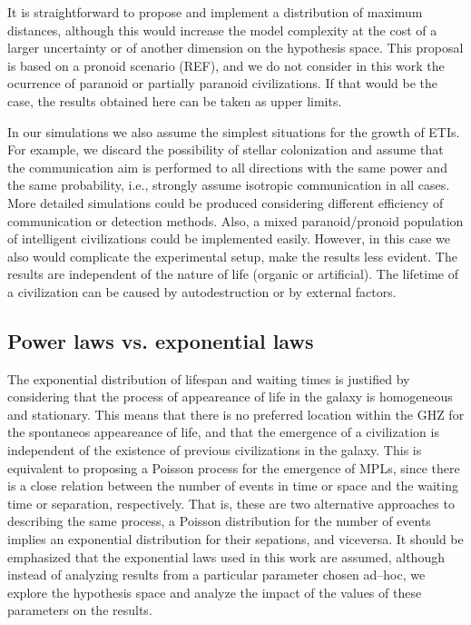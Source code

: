 %
It is straightforward to propose and implement a distribution of
maximum distances, although this would increase the model complexity
at the cost of a larger uncertainty or of another dimension on the
hypothesis space.
%
This proposal is based on a pronoid scenario (REF), and we do not
consider in this work the ocurrence of paranoid or partially paranoid
civilizations.
%
If that would be the case, the results obtained here can be taken as
upper limits.



In our simulations we also assume the simplest situations for the
growth of ETIs.
%
For example, we discard the possibility of stellar colonization
\citep[e.g.][]{newman_galactic_1981, walters_interstellar_1980,
starling_virulence_2013, barlow_galactic_2012, jeong_large_2000, maccone_mathematical_2011}
and assume that the communication aim is performed to
all directions with the same power and the same probability, i.e.,
strongly assume isotropic communication in all cases.
%
More detailed simulations could be produced considering different 
efficiency of communication or detection methods.
%
Also, a mixed paranoid/pronoid population of intelligent civilizations
could be implemented easily.
%
However, in this case we also would complicate the experimental setup,
make the results less evident.
%
The results are independent of the nature of life (organic or
artificial).
%
The lifetime of a civilization can be caused by autodestruction or by
external factors.

\subsection{Power laws vs. exponential laws}\label{SS_PDF_shape}

The exponential distribution of lifespan and waiting times is
justified by considering that the process of appeareance of life in
the galaxy is homogeneous and stationary.
%
This means that there is no preferred location within the GHZ for the
spontaneos appeareance of life, and that the emergence of a
civilization is independent of the existence of previous civilizations 
in the galaxy.
%            
This is equivalent to proposing a Poisson process for the emergence of
MPLs, since there is a close relation between the number of events in
time or space and the waiting time or separation, respectively.
%
That is, these are two alternative approaches to describing the same
process, a Poisson distribution for the number of events implies an
exponential distribution for their sepations, and viceversa.
%
It should be emphasized that the exponential laws used in this work
are assumed, although instead of analyzing results from a particular
parameter chosen ad--hoc, we explore the hypothesis space and analyze
the impact of the values of these parameters on the results.
%                                                           

